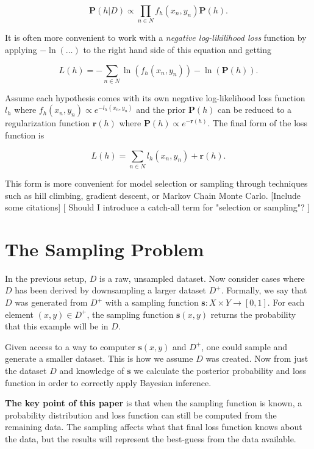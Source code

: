 \documentclass[twoside]{article}
\begin{document}
\[\mathbf{P}(h|D)\propto\prod_{n \in N} f_h(x_n,y_n)\mathbf{P}(h).\]

It is often more convenient to work with a \textit{negative log-likilihood loss} function by applying \(-\ln(\ldots)\) to the right hand side of this equation and getting

\[L(h)=-\sum_{n \in N} \ln(f_h(x_n,y_n))-\ln(\mathbf{P}(h)).\]

Assume each hypothesis comes with its own negative log-likelihood loss function \(l_h\) where \(f_h(x_n,y_n)\propto e^{-l_h(x_n,y_n)}\) and the prior \(\mathbf{P}(h)\) can be reduced to a regularization function \(\mathbf{r}(h)\) where \(\mathbf{P}(h)\propto e^{-\mathbf{r}(h)}\). The final form of the loss function is

\[L(h)=\sum_{n \in N} l_h(x_n,y_n)+\mathbf{r}(h).\]

This form is more convenient for model selection or sampling through techniques such as hill climbing, gradient descent, or Markov Chain Monte Carlo. [Include some citations]
[ Should I introduce a catch-all term for "selection or sampling"? ]

\section{The Sampling Problem}
\label{section:problem}

In the previous setup, \(D\) is a raw, unsampled dataset. Now consider cases where \(D\) has been derived by downsampling a larger dataset \(D^+\). Formally, we say that \(D\) was generated from \(D^+\) with a sampling function \(\mathbf{s}: X \times Y \rightarrow \left [ 0,1\right ]\). For each element \((x,y)\in D^+\), the sampling function \(\mathbf{s}(x,y)\) returns the probability that this example will be in \(D\).

Given access to a way to computer \(\mathbf{s}(x,y)\) and \(D^+\), one could sample and generate a smaller dataset. This is how we assume \(D\) was created. Now from just the dataset \(D\) and knowledge of \(\mathbf{s}\) we calculate the posterior probability and loss function in order to correctly apply Bayesian inference.

\textbf{The key point of this paper} is that when the sampling function is known, a probability distribution and loss function can still be computed from the remaining data. The sampling affects what that final loss function knows about the data, but the results will represent the best-guess from the data available.
\end{document}
